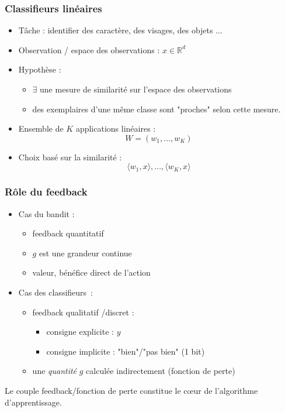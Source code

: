 \documentclass{beamer}
\begin{document}
\begin{frame}
	\frametitle{Classifieurs linéaires}
	\begin{itemize}
		\item Tâche : identifier des caractère, des visages, des objets ...
		\item Observation / espace des observations : $x \in \mathbb{R}^d $ 
		\item Hypothèse : 
		\begin{itemize}
			\item $\exists$ une mesure de similarité sur l'espace des observations 
			\item des exemplaires d'une même classe  sont "proches" selon cette mesure.
		\end{itemize}
		\item Ensemble de $K$ applications linéaires :
		$$ W = (w_1, ..., w_K)$$
		\item Choix basé sur la similarité :
		$$ \langle w_1,x\rangle, ...,   \langle w_K,x\rangle$$
	\end{itemize}
\end{frame}

\begin{frame}\frametitle{Rôle du feedback}
 \begin{itemize}
 	\item Cas du bandit : 
 	\begin{itemize}
 		\item feedback quantitatif 
 		\item $g$ est une grandeur continue
 		\item valeur, bénéfice direct de l'action
 	\end{itemize}
 	\item Cas des classifieurs~:
 	\begin{itemize}
 		\item feedback qualitatif /discret :
 		\begin{itemize}
 			\item consigne explicite : $y$
 			\item consigne implicite : "bien"/"pas bien" (1 bit)
 		\end{itemize}
 		\item une \textit{quantité} $g$ calculée indirectement (fonction de perte)
 	\end{itemize}
 \end{itemize}
 
 \begin{block}{}
Le couple feedback/fonction de perte constitue le cœur de l'algorithme d'apprentissage.
 \end{block}
 
\end{frame}
\end{document}
